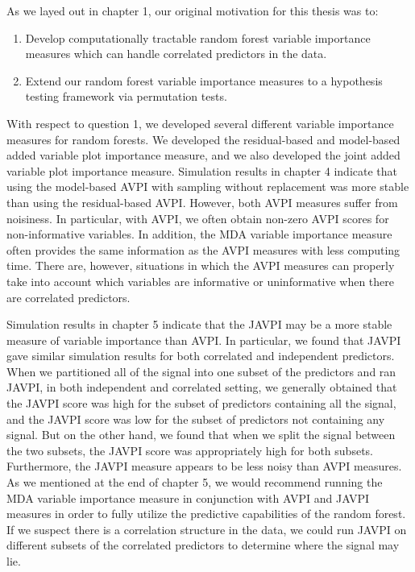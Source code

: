 \documentclass[12pt,twoside]{reedthesis}
\theoremstyle{definition}
\theoremstyle{definition}
\theoremstyle{definition}
\theoremstyle{remark}
\begin{document}
As we layed out in chapter 1, our original motivation for this thesis
was to:
\begin{enumerate}
  \item Develop computationally tractable random forest variable importance measures which can handle correlated predictors in the data. 
  \item Extend our random forest variable importance measures to a hypothesis testing framework via permutation tests. 
\end{enumerate}
\par

With respect to question 1, we developed several different variable
importance measures for random forests. We developed the residual-based
and model-based added variable plot importance measure, and we also
developed the joint added variable plot importance measure. Simulation
results in chapter 4 indicate that using the model-based AVPI with
sampling without replacement was more stable than using the
residual-based AVPI. However, both AVPI measures suffer from noisiness.
In particular, with AVPI, we often obtain non-zero AVPI scores for
non-informative variables. In addition, the MDA variable importance
measure often provides the same information as the AVPI measures with
less computing time. There are, however, situations in which the AVPI
measures can properly take into account which variables are informative
or uninformative when there are correlated predictors. \par 

Simulation results in chapter 5 indicate that the JAVPI may be a more
stable measure of variable importance than AVPI. In particular, we found
that JAVPI gave similar simulation results for both correlated and
independent predictors. When we partitioned all of the signal into one
subset of the predictors and ran JAVPI, in both independent and
correlated setting, we generally obtained that the JAVPI score was high
for the subset of predictors containing all the signal, and the JAVPI
score was low for the subset of predictors not containing any signal.
But on the other hand, we found that when we split the signal between
the two subsets, the JAVPI score was appropriately high for both
subsets. Furthermore, the JAVPI measure appears to be less noisy than
AVPI measures. As we mentioned at the end of chapter 5, we would
recommend running the MDA variable importance measure in conjunction
with AVPI and JAVPI measures in order to fully utilize the predictive
capabilities of the random forest. If we suspect there is a correlation
structure in the data, we could run JAVPI on different subsets of the
correlated predictors to determine where the signal may lie. \par 
\end{document}
